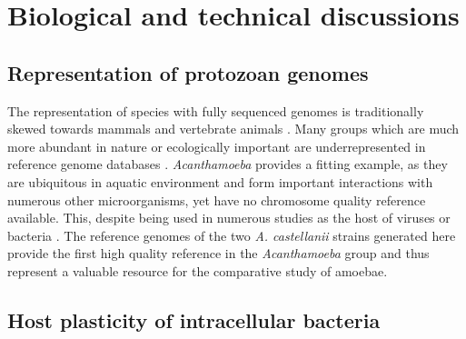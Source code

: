 
\chapter{Biological and technical discussions} %
\label{ch:03-01} %

\section{Representation of protozoan genomes}

The representation of species with fully sequenced genomes is traditionally skewed towards mammals and vertebrate animals \cite{hotalingGenomeSequenceEvery2021}. Many groups which are much more abundant in nature or ecologically important are underrepresented in reference genome databases \cite{davidSequencingDisparityGenomic2019}. \textit{Acanthamoeba} provides a fitting example, as they are ubiquitous in aquatic environment and form important interactions with numerous other microorganisms, yet have no chromosome quality reference available. This, despite being used in numerous studies as the host of viruses or bacteria \cite{priceMolecularMimicryFBox2009,legendreIndepthStudyMollivirus2015,konigBiphasicMetabolismHost2017}.  The reference genomes of the two \textit{A. castellanii} strains generated here provide the first high quality reference in the \textit{Acanthamoeba} group and thus represent a valuable resource for the comparative study of amoebae.

\section{Host plasticity of intracellular bacteria}

